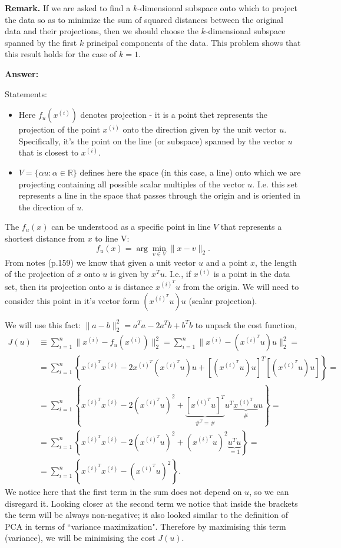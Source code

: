 \documentclass{article}
\begin{document}
\textbf{Remark.} If we are asked to find a $k$-dimensional subspace onto which to project the data so as to minimize the sum of squared distances between the original data and their projections, then we should choose the $k$-dimensional subspace spanned by the first $k$ principal components of the data. This problem shows that this result holds for the case of $k = 1$.

\textbf{Answer:}

Statements:
\begin{itemize}

\item Here $f_{u}(x^{(i)})$ denotes projection - it is a point thet represents the projection of the point $x^{(i)}$ onto the direction given by the unit vector $u$. Specifically, it's the point on the line (or subspace) spanned by the vector $u$ that is closest to $x^{(i)}$.

\item $V= \{\alpha u : \alpha \in \mathbb{R}\}$ defines  here the space (in this case, a line) onto which we are projecting containing all possible scalar multiples of the vector $u$. I.e. this set represents a line in the space that passes through the origin and is oriented in the direction of $u$.

 \end{itemize}

 The $f_u(x)$ can be understood as a specific point in line $V$ that represents a shortest distance from $x$ to line V:
 \[
f_u(x) = \arg \min_{v \in V} \|x - v\|_2.
\]
 From notes (p.159) we know that given a
unit vector $u$ and a point $x$, the length of the projection of $x$ onto $u$ is given by $x^T u$. I.e., if $x^{(i)}$ is a point in the data set, then its projection onto $u$ is distance $x^{(i)^T} u$ from the origin. We will need to consider this point in it's vector form $(x^{(i)^T}u)u
$ (scalar projection).

We will use this fact: $\|a-b\|^2_2 = a^Ta - 2a^Tb + b^Tb$ to unpack the cost function,
\begin{align*}
   J(u)&\equiv \sum_{i=1}^{n} \|x^{(i)} - f_u(x^{(i)})\|_2^2 = \sum_{i=1}^{n} \|x^{(i)} - (x^{(i)^T} u)u\|_2^2 = \\[10pt]
   &=\sum_{i=1}^{n}\left\{x^{(i)^T}x^{(i)} - 2 x^{(i)^T}(x^{(i)^T}u)u + [(x^{(i)^T}u)u]^T[(x^{(i)^T}u)u]\right\} = \\[10pt]
   &=\sum_{i=1}^{n}\left\{x^{(i)^T}x^{(i)} - 2 (x^{(i)^T}u)^2 + \underbrace{[x^{(i)^T}u]^{T}}_{\#^T = 
   \#}u^T \underbrace{x^{(i)^T}u}_{\#}u    \right\} = \\[10pt]
   &= \sum_{i=1}^{n}\left\{x^{(i)^T}x^{(i)} - 2 (x^{(i)^T}u)^2 + (x^{(i)^T}u)^2 \underbrace{u^Tu}_{=1} \right\}= \\[10pt]
   &= \sum_{i=1}^{n}\left\{x^{(i)^T}x^{(i)} - (x^{(i)^T}u)^2\right\}.
\end{align*}
We notice here that the first term in the sum does not depend on $u$, so we can disregard it. Looking closer at the second term we notice that inside the brackets the term will be always non-negative; it also  looked similar to the definition of PCA in terms of
``variance maximization". Therefore by maximising this term (variance), we will be minimising the  cost $J(u)$.  
\end{document}
